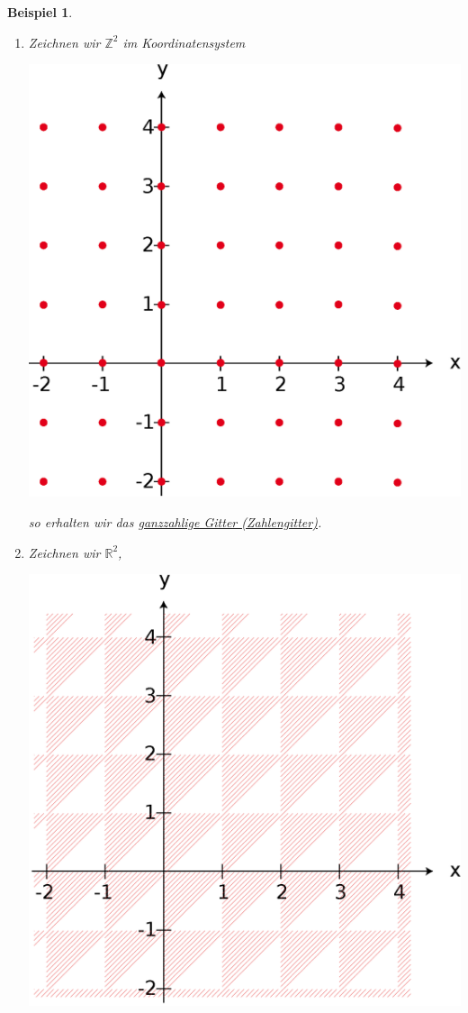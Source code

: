 \documentclass{report}
\newtheorem{myexample}{Beispiel}
\begin{document}
\begin{myexample}
\begin{enumerate}
Die Elemente von $M^4$ heissen \underline{Quadrupel}. Fahren wir so fort, so erhalten wir Quintupel, Sextupel, ..., \underline{n-Tupel} ($n \in \mathbb{N}$).
\item Zeichnen wir $\mathbb{Z}^2$ im Koordinatensystem
\begin{center}\includegraphics[scale=0.25]{img/2_5-z-squared.eps}\end{center}
so erhalten wir das \underline{ganzzahlige Gitter (Zahlengitter)}.
\item Zeichnen wir $\mathbb{R}^2$,
\begin{center}\includegraphics[scale=0.3]{img/2_5-r-plane.eps}\end{center}

\end{enumerate}
\end{myexample}
\end{document}
